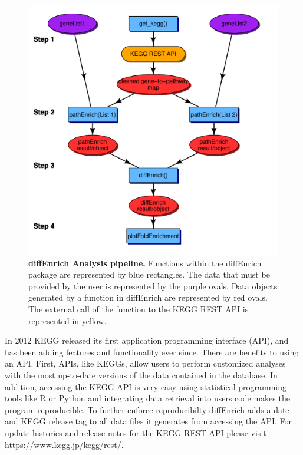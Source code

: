 \documentclass[article]{jss}\usepackage[]{graphicx}\usepackage[]{color}
\makeatletter
\def\maxwidth{ %
  \ifdim\Gin@nat@width>\linewidth
    \linewidth
  \else
    \Gin@nat@width
  \fi
}
\newenvironment{knitrout}{}{} %
\makeatother
\begin{document}
\begin{figure}[!ht]
\begin{knitrout}
\color{fgcolor}
\includegraphics[width=\maxwidth]{figure/visualization-1} 

\end{knitrout}
\caption{\label{fig:flowchart} \textbf{diffEnrich Analysis pipeline.} Functions within
the diffEnrich package are represented by blue rectangles. The data that must be
provided by the user is represented by the purple ovals. Data objects generated
by a function in diffEnrich are represented by red ovals. The external call of
the  function to the KEGG REST API is represented in yellow.}
\end{figure}

In 2012 KEGG released its first application programming interface (API), and has
been adding features and functionality ever since. There are benefits to using
an API. First, API\textquotesingle s, like KEGG\textquotesingle s, allow users to
perform customized analyses with the most up-to-date versions of the data
contained in the database. In addition, accessing the KEGG API is very easy
using statistical programming tools like R or Python and integrating data
retrieval into user\textquotesingle s code makes the
program reproducible. To further enforce reproducibilty diffEnrich adds a date
and KEGG release tag to all data files it generates from accessing the API. For
update histories and release notes for the KEGG REST API please visit
\url{https://www.kegg.jp/kegg/rest/}.
\end{document}
